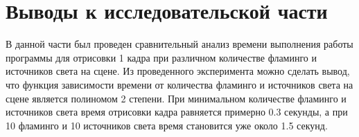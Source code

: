 \section{Выводы к исследовательской части}

В данной части был проведен сравнительный анализ времени выполнения работы программы для отрисовки 1 кадра при различном количестве фламинго и источников света на сцене. Из проведенного эксперимента можно сделать вывод, что функция зависимости времени от количества фламинго и источников света на сцене является полиномом 2 степени. При минимальном количестве фламинго и источников света время отрисовки кадра равняется примерно 0.3 секунды, а при 10 фламинго и 10 источников света время становится уже около 1.5 секунд.